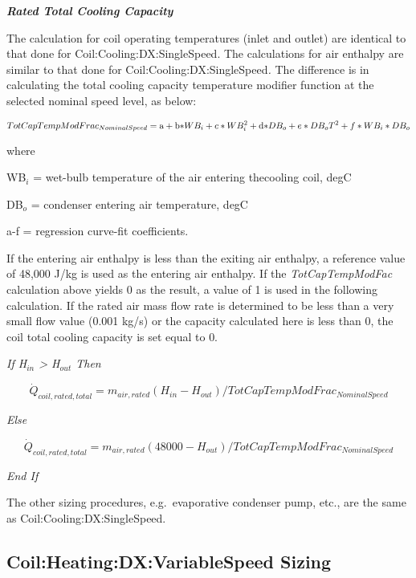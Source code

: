 \textbf{\emph{Rated Total Cooling Capacity}}

The calculation for coil operating temperatures (inlet and outlet) are identical to that done for Coil:Cooling:DX:SingleSpeed. The calculations for air enthalpy are similar to that done for Coil:Cooling:DX:SingleSpeed\emph{.} The difference is in calculating the total cooling capacity temperature modifier function at the selected nominal speed level, as below:

\begin{equation}
TotCapTempModFra{c_{NominalSpeed}} = {\rm{a}} + {\rm{b*}}W{B_i} + c*WB_i^2 + {\rm{d*}}D{B_o} + e*D{B_o}{T^2} + f*W{B_i}*D{B_o}
\end{equation}

where

WB\(_{i}\) = wet-bulb temperature of the air entering thecooling coil, degC

DB\(_{o}\) = condenser entering air temperature, degC

a-f = regression curve-fit coefficients.

If the entering air enthalpy is less than the exiting air enthalpy, a reference value of 48,000 J/kg is used as the entering air enthalpy. If the \emph{TotCapTempModFac} calculation above yields 0 as the result, a value of 1 is used in the following calculation. If the rated air mass flow rate is determined to be less than a very small flow value (0.001 kg/s) or the capacity calculated here is less than 0, the coil total cooling capacity is set equal to 0.

\emph{If H\(_{in}\) \textgreater{} H\(_{out}\) Then}

\begin{equation}
{\dot Q_{coil,rated,total}} = {m_{air,rated}}({H_{in}} - {H_{out}})/TotCapTempModFra{c_{NominalSpeed}}
\end{equation}

\emph{Else}

\begin{equation}
{\dot Q_{coil,rated,total}} = {m_{air,rated}}(48000 - {H_{out}})/TotCapTempModFra{c_{NominalSpeed}}
\end{equation}

\emph{End If}

The other sizing procedures, e.g.~evaporative condenser pump, etc., are the same as Coil:Cooling:DX:SingleSpeed.

\subsection{Coil:Heating:DX:VariableSpeed Sizing}\label{coilheatingdxvariablespeed-sizing}

